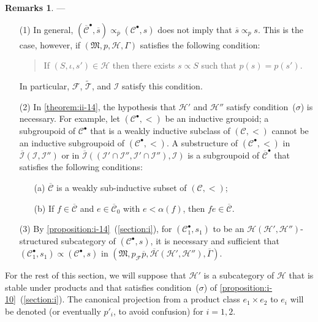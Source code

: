 \documentclass[a4paper,fleqn]{article}
\theoremstyle{plain}
\theoremstyle{definition}
\newtheorem*{remarks}{Remarks}
\newcommand{\CC}{\mathcal{C}}
\newcommand{\HH}{\mathcal{H}}
\newcommand{\MM}{\mathfrak{M}}
\newcommand{\FF}{\mathcal{F}}
\newcommand{\TT}{\mathcal{T}}
\newcommand{\subs}{\mathrel{\propto}}
\newcommand{\II}{\mathcal{I}}
\begin{document}
\begin{remarks}
  ---
  \begin{enumerate}
    \item[\normalfont(1)]
      In general, $(\overline{\CC}^\bullet,\overline{s})\subs_{\overline{p}}(\CC^\bullet,s)$ does not imply that $\overline{s}\subs_p s$.
      This is the case, however, if $(\MM,p,\HH,\Gamma)$ satisfies the following condition:
      \begin{quote}
        If $(S,\iota,s')\in\HH$ then there exists $s\subs S$ such that $p(s)=p(s')$.
      \end{quote}
      In particular, $\FF$, $\widetilde{\TT}$, and $\II$ satisfy this condition.

    \item[\normalfont(2)]
      In \cref{theorem:ii-14}, the hypothesis that $\HH'$ and $\HH''$ satisfy condition~($\sigma$) is necessary.
      For example, let $(\CC^\bullet,<)$ be an inductive groupoid;
      a subgroupoid of $\CC^\bullet$ that is a weakly inductive subclass of $(\CC,<)$ cannot be an inductive subgroupoid of $(\CC^\bullet,<)$.
      A substructure of $(\CC^\bullet,<)$ in $\overline{\II}(\II,\II'')$ or in $\overline{\II}((\II'\cap\II'',\II'\cap\II''),\II)$ is a subgroupoid of $\overline{\CC}^\bullet$ that satisfies the following conditions:
      \begin{enumerate}
        \item[\normalfont(a)]
          $\overline{\CC}$ is a weakly sub-inductive subset of $(\CC,<)$;
        \item[\normalfont(b)]
          If $f\in\overline{\CC}$ and $e\in\overline{\CC}_0$ with $e<\alpha(f)$, then $fe\in\overline{\CC}$.
      \end{enumerate}

    \item[\normalfont(3)]
      By \cref{proposition:i-14}~(\cref{section:i}), for $(\CC_1^\bullet,s_1)$ to be an $\HH(\HH',\HH'')$-structured subcategory of $(\CC^\bullet,s)$, it is necessary and sufficient that $(\CC_1^\bullet,s_1)\subs(\CC^\bullet,s)$ in $(\MM,p_\FF\overline{p},\overline{\HH}(\HH',\HH''),\overline{\Gamma})$.
  \end{enumerate}
\end{remarks}

For the rest of this section, we will suppose that $\HH'$ is a subcategory of $\HH$ that is stable under products and that satisfies condition~($\sigma$) of \cref{proposition:i-10}~(\cref{section:i}).
The canonical projection from a product class $e_1\times e_2$ to $e_i$ will be denoted (or eventually $p'_i$, to avoid confusion) for $i=1,2$.
\end{document}
